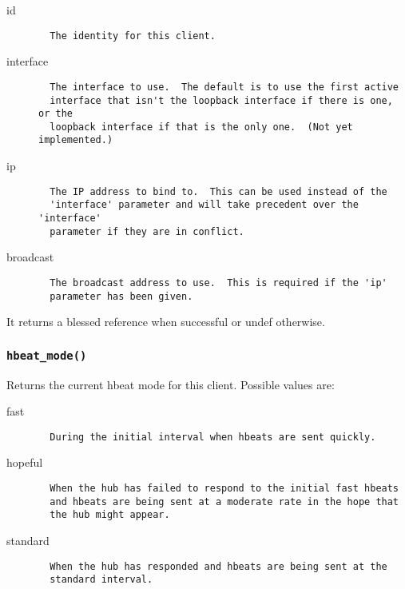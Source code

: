 \begin{description}

\item[{id}] \mbox{}\begin{verbatim}
  The identity for this client.
\end{verbatim}

\item[{interface}] \mbox{}\begin{verbatim}
  The interface to use.  The default is to use the first active
  interface that isn't the loopback interface if there is one, or the
  loopback interface if that is the only one.  (Not yet implemented.)
\end{verbatim}

\item[{ip}] \mbox{}\begin{verbatim}
  The IP address to bind to.  This can be used instead of the
  'interface' parameter and will take precedent over the 'interface'
  parameter if they are in conflict.
\end{verbatim}

\item[{broadcast}] \mbox{}\begin{verbatim}
  The broadcast address to use.  This is required if the 'ip'
  parameter has been given.
\end{verbatim}
\end{description}


It returns a blessed reference when successful or undef otherwise.

\subsubsection*{\texttt{hbeat\_mode()}\label{xPL::Client_hbeat_mode_}}


Returns the current hbeat mode for this client.  Possible values
are:

\begin{description}

\item[{fast}] \mbox{}\begin{verbatim}
  During the initial interval when hbeats are sent quickly.
\end{verbatim}

\item[{hopeful}] \mbox{}\begin{verbatim}
  When the hub has failed to respond to the initial fast hbeats
  and hbeats are being sent at a moderate rate in the hope that
  the hub might appear.
\end{verbatim}

\item[{standard}] \mbox{}\begin{verbatim}
  When the hub has responded and hbeats are being sent at the
  standard interval.
\end{verbatim}
\end{description}
